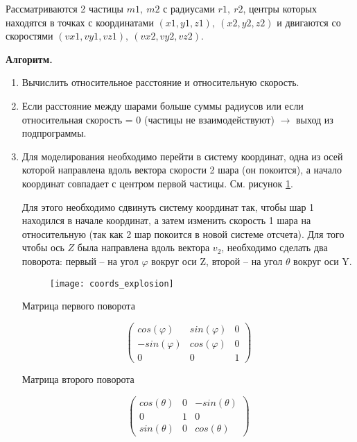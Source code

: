 Рассматриваются 2 частицы $m1,~ m2$ с радиусами $r1,~r2$, центры которых находятся в точках с координатами $(x1,y1,z1),~(x2,y2,z2)$ и двигаются со скоростями $(vx1,vy1,vz1),~(vx2,vy2,vz2)$. 

\textbf{Алгоритм. }
\begin{enumerate}
	\item Вычислить относительное расстояние и относительную скорость. 
	
	\item Если расстояние между шарами больше суммы радиусов или если относительная скорость = 0 (частицы не взаимодействуют) $\to$ выход из подпрограммы. 
	
	\item Для моделирования необходимо перейти в систему координат, одна из осей которой направлена вдоль вектора скорости 2 шара (он покоится), а начало координат совпадает с центром первой частицы. См. рисунок  \ref{img:coords_explosion}. 
	
	Для этого необходимо сдвинуть систему координат так, чтобы шар 1 находился в начале координат, а затем изменить скорость 1 шара на относительную (так как 2 шар покоится в новой системе отсчета). Для того чтобы ось $Z$ была направлена вдоль вектора $v_2$, необходимо сделать два поворота: первый -- на угол $\varphi$ вокруг оси Z, второй -- на угол $\theta$ вокруг оси Y.
	
	\begin{figure}[H]
		\centering
		\texttt{[image: coords\_explosion]}
		\caption{}
		\label{img:coords_explosion}
	\end{figure}
	
	Матрица первого поворота
	
	\begin{equation}
		\begin{pmatrix}
			cos(\varphi)& sin(\varphi) & 0\\
			-sin(\varphi)& cos(\varphi) & 0\\
			0&0&1
		\end{pmatrix}
		\label{eq:matr_varphi}
	\end{equation}
	
	Матрица второго поворота
	
	\begin{equation}
		\begin{pmatrix}
			cos(\theta)& 0 & -sin(\theta)\\
			0& 1 & 0\\
			sin(\theta)&0&cos(\theta)
		\end{pmatrix}
		\label{eq:matr_theta}
	\end{equation}
	

\end{enumerate}
